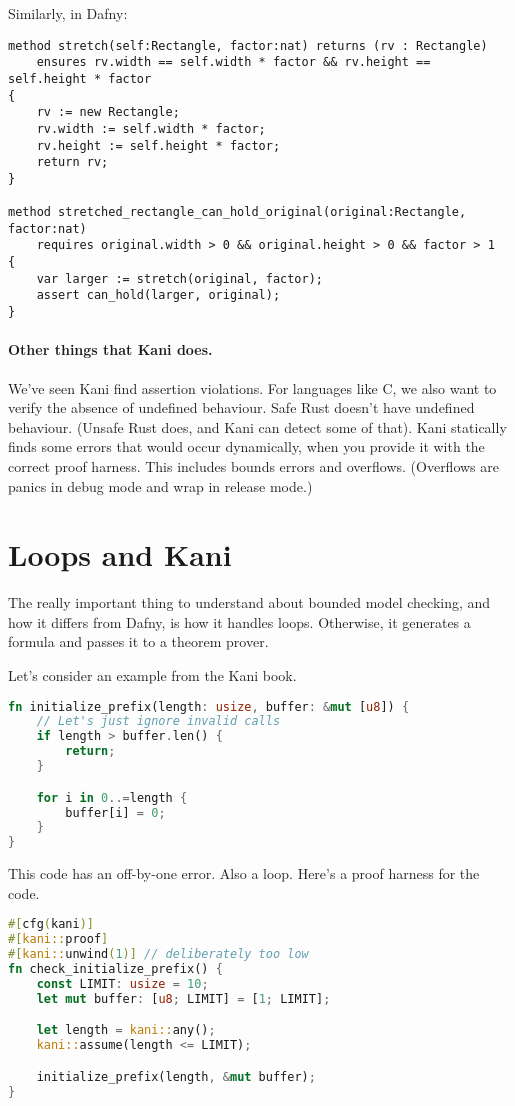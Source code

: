 \documentclass[11pt]{article}
\begin{document}
Similarly, in Dafny:
\begin{lstlisting}[language=dafny]
method stretch(self:Rectangle, factor:nat) returns (rv : Rectangle)
    ensures rv.width == self.width * factor && rv.height == self.height * factor
{
    rv := new Rectangle;
    rv.width := self.width * factor;
    rv.height := self.height * factor;
    return rv;
}

method stretched_rectangle_can_hold_original(original:Rectangle, factor:nat)
    requires original.width > 0 && original.height > 0 && factor > 1
{
    var larger := stretch(original, factor);
    assert can_hold(larger, original);
}
\end{lstlisting}

\paragraph{Other things that Kani does.} We've seen Kani find assertion violations.
For languages like C, we also want to verify the absence of undefined behaviour.
Safe Rust doesn't have undefined behaviour. (Unsafe Rust does, and Kani can detect
some of that). Kani statically finds some errors that would occur dynamically,
when you provide it with the correct proof harness. This includes bounds errors
and overflows. (Overflows are panics in debug mode and wrap in release mode.)

\section*{Loops and Kani}
The really important thing to understand about bounded model checking,
and how it differs from Dafny, is how it handles loops. Otherwise, it
generates a formula and passes it to a theorem prover.

Let's consider an example from the Kani book.
\begin{lstlisting}[language=Rust]
fn initialize_prefix(length: usize, buffer: &mut [u8]) {
    // Let's just ignore invalid calls
    if length > buffer.len() {
        return;
    }

    for i in 0..=length {
        buffer[i] = 0;
    }
}
\end{lstlisting}
This code has an off-by-one error. Also a loop. Here's a proof harness
for the code.

\begin{lstlisting}[language=Rust]
#[cfg(kani)]
#[kani::proof]
#[kani::unwind(1)] // deliberately too low
fn check_initialize_prefix() {
    const LIMIT: usize = 10;
    let mut buffer: [u8; LIMIT] = [1; LIMIT];

    let length = kani::any();
    kani::assume(length <= LIMIT);

    initialize_prefix(length, &mut buffer);
}
\end{lstlisting}
\end{document}

